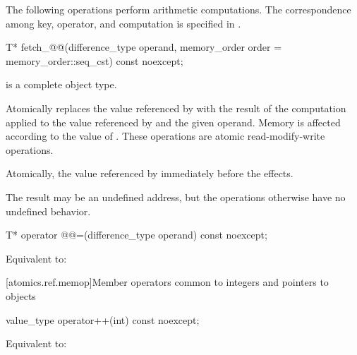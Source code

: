 \pnum
The following operations perform arithmetic computations.
The correspondence among key, operator, and computation is specified
in .

%
%
\begin{itemdecl}
T* fetch_@@(difference_type operand, memory_order order = memory_order::seq_cst) const noexcept;
\end{itemdecl}

\begin{itemdescr}
\pnum
\mandates
{} is a complete object type.

\pnum
\effects
Atomically replaces the value referenced by  with
the result of the computation applied to the value referenced by 
and the given operand.
Memory is affected according to the value of .
These operations are atomic read-modify-write operations.

\pnum
\returns
Atomically, the value referenced by 
immediately before the effects.

\pnum
\remarks
The result may be an undefined address,
but the operations otherwise have no undefined behavior.
\end{itemdescr}

%
%
\begin{itemdecl}
T* operator @@=(difference_type operand) const noexcept;
\end{itemdecl}

\begin{itemdescr}
\pnum
\effects
Equivalent to:
\end{itemdescr}

[atomics.ref.memop]{Member operators
                          common to integers and pointers to objects}

%
%
\begin{itemdecl}
value_type operator++(int) const noexcept;
\end{itemdecl}

\begin{itemdescr}
\pnum
\effects
Equivalent to: 
\end{itemdescr}

